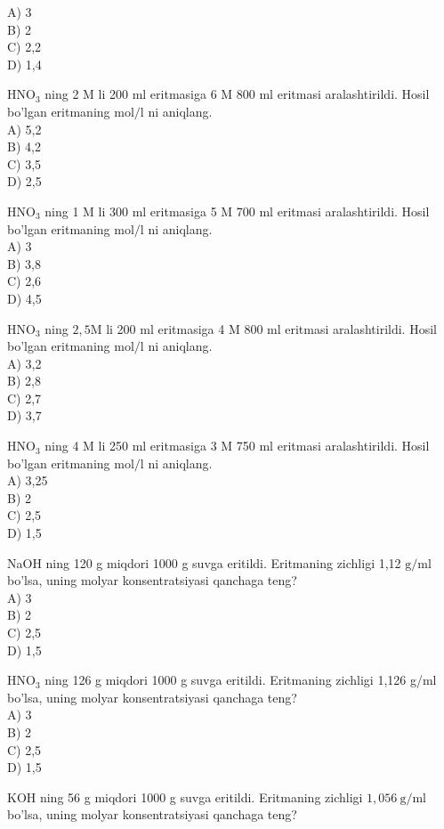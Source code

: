 A) 3\\
B) 2\\
C) 2,2\\
D) 1,4
  \item $\mathrm{HNO}_{3}$ ning 2 M li 200 ml eritmasiga 6 M 800 ml eritmasi aralashtirildi. Hosil bo'lgan eritmaning $\mathrm{mol} / \mathrm{l}$ ni aniqlang.\\
A) 5,2\\
B) 4,2\\
C) 3,5\\
D) 2,5
  \item $\mathrm{HNO}_{3}$ ning 1 M li 300 ml eritmasiga 5 M 700 ml eritmasi aralashtirildi. Hosil bo'lgan eritmaning $\mathrm{mol} / \mathrm{l}$ ni aniqlang.\\
A) 3\\
B) 3,8\\
C) 2,6\\
D) 4,5
  \item $\mathrm{HNO}_{3}$ ning $2,5 \mathrm{M}$ li 200 ml eritmasiga 4 M 800 ml eritmasi aralashtirildi. Hosil bo'lgan eritmaning $\mathrm{mol} / \mathrm{l}$ ni aniqlang.\\
A) 3,2\\
B) 2,8\\
C) 2,7\\
D) 3,7
  \item $\mathrm{HNO}_{3}$ ning 4 M li 250 ml eritmasiga 3 M 750 ml eritmasi aralashtirildi. Hosil bo'lgan eritmaning $\mathrm{mol} / \mathrm{l}$ ni aniqlang.\\
A) 3,25\\
B) 2\\
C) 2,5\\
D) 1,5
  \item NaOH ning 120 g miqdori 1000 g suvga eritildi. Eritmaning zichligi 1,12 $\mathrm{g} / \mathrm{ml}$ bo'lsa, uning molyar konsentratsiyasi qanchaga teng?\\
A) 3\\
B) 2\\
C) 2,5\\
D) 1,5\\
  \item $\mathrm{HNO}_{3}$ ning 126 g miqdori 1000 g suvga eritildi. Eritmaning zichligi 1,126 g/ml bo'lsa, uning molyar konsentratsiyasi qanchaga teng?\\
A) 3\\
B) 2\\
C) 2,5\\
D) 1,5
  \item KOH ning 56 g miqdori 1000 g suvga eritildi. Eritmaning zichligi $1,056 \mathrm{~g} / \mathrm{ml}$ bo'lsa, uning molyar konsentratsiyasi qanchaga teng?\\
